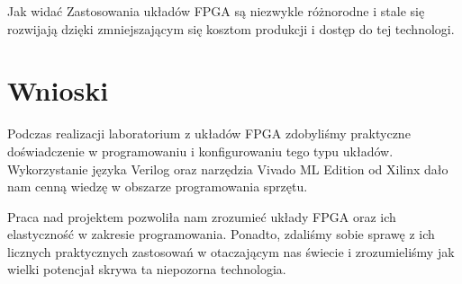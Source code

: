 \documentclass[a4paper]{article}
\begin{document}
Jak widać Zastosowania układów FPGA są niezwykle różnorodne i stale się rozwijają
dzięki zmniejszającym się kosztom produkcji i  dostęp do tej technologi.

\section{Wnioski}

Podczas realizacji laboratorium z układów FPGA zdobyliśmy praktyczne doświadczenie w programowaniu i konfigurowaniu tego typu układów. 
Wykorzystanie języka Verilog oraz narzędzia Vivado ML Edition od Xilinx dało nam cenną wiedzę w obszarze programowania sprzętu.

Praca nad projektem pozwoliła nam zrozumieć układy FPGA oraz ich elastyczność w zakresie programowania.
Ponadto, zdaliśmy sobie sprawę z ich licznych praktycznych zastosowań w otaczającym nas świecie
i zrozumieliśmy jak wielki potencjał skrywa ta niepozorna technologia.
\end{document}
